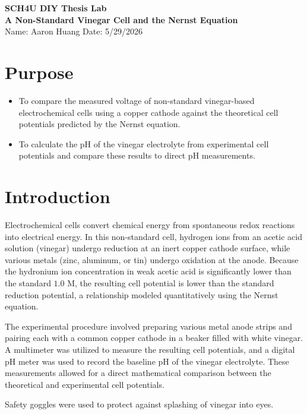 \documentclass[11pt]{article}
\begin{document}
\begin{center}
  {\LARGE \textbf{SCH4U DIY Thesis Lab}}\\[1em]
  {\large \textbf{A Non-Standard Vinegar Cell and the Nernst Equation}}\\[0.5em]
  {\normalsize Name: Aaron Huang \hspace{2cm} Date: 5/29/2026}
\end{center}

\section*{Purpose}
\begin{itemize}
  \item To compare the measured voltage of non-standard vinegar-based electrochemical cells using a copper cathode against the theoretical cell potentials predicted by the Nernst equation.
  \item To calculate the pH of the vinegar electrolyte from experimental cell potentials and compare these results to direct pH measurements.
\end{itemize}

\section*{Introduction}
Electrochemical cells convert chemical energy from spontaneous redox reactions into electrical energy. In this non-standard cell, hydrogen ions from an acetic acid solution (vinegar) undergo reduction at an inert copper cathode surface, while various metals (zinc, aluminum, or tin) undergo oxidation at the anode. Because the hydronium ion concentration in weak acetic acid is significantly lower than the standard $1.0\text{ M}$, the resulting cell potential is lower than the standard reduction potential, a relationship modeled quantitatively using the Nernst equation.

The experimental procedure involved preparing various metal anode strips and pairing each with a common copper cathode in a beaker filled with white vinegar. A multimeter was utilized to measure the resulting cell potentials, and a digital pH meter was used to record the baseline pH of the vinegar electrolyte. These measurements allowed for a direct mathematical comparison between the theoretical and experimental cell potentials.

Safety goggles were used to protect against splashing of vinegar into eyes.
\end{document}
